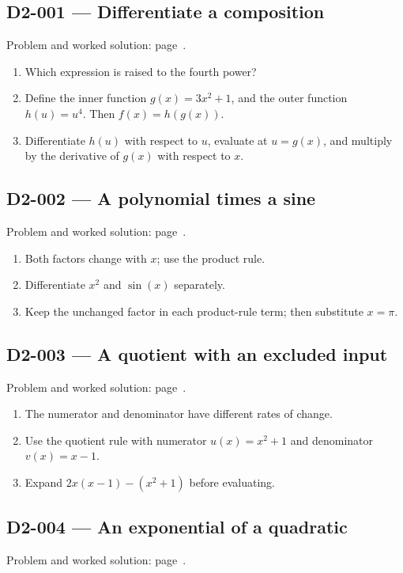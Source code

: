 \documentclass[11pt,oneside,openany]{book}
\begin{document}
\subsection*{D2-001 --- Differentiate a composition}
\label{hints:D2-001}
Problem and worked solution: page~\pageref{problem:D2-001}.

\begin{enumerate}
\item Which expression is raised to the fourth power?
\item Define the inner function \(g(x)=3x^2+1\), and the outer function \(h(u)=u^4\). Then \(f(x)=h(g(x))\).
\item Differentiate \(h(u)\) with respect to \(u\), evaluate at \(u=g(x)\), and multiply by the derivative of \(g(x)\) with respect to \(x\).
\end{enumerate}
\subsection*{D2-002 --- A polynomial times a sine}
\label{hints:D2-002}
Problem and worked solution: page~\pageref{problem:D2-002}.

\begin{enumerate}
\item Both factors change with \(x\); use the product rule.
\item Differentiate \(x^2\) and \(\sin(x)\) separately.
\item Keep the unchanged factor in each product-rule term; then substitute \(x=\pi\).
\end{enumerate}
\subsection*{D2-003 --- A quotient with an excluded input}
\label{hints:D2-003}
Problem and worked solution: page~\pageref{problem:D2-003}.

\begin{enumerate}
\item The numerator and denominator have different rates of change.
\item Use the quotient rule with numerator \(u(x)=x^2+1\) and denominator \(v(x)=x-1\).
\item Expand \(2x(x-1)-(x^2+1)\) before evaluating.
\end{enumerate}
\subsection*{D2-004 --- An exponential of a quadratic}
\label{hints:D2-004}
Problem and worked solution: page~\pageref{problem:D2-004}.
\end{document}
